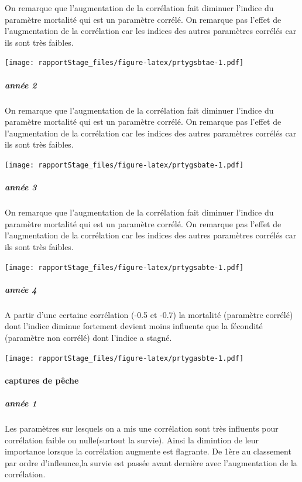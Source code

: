 \documentclass[
]{article}
\begin{document}
On remarque que l'augmentation de la corrélation fait diminuer l'indice
du paramètre mortalité qui est un paramètre corrélé. On remarque pas
l'effet de l'augmentation de la corrélation car les indices des autres
paramètres corrélés car ils sont très faibles.

\texttt{[image: rapportStage\_files/figure-latex/prtygsbtae-1.pdf]}

\hypertarget{annuxe9e-2}{%
\subparagraph{année 2}\label{annuxe9e-2}}

On remarque que l'augmentation de la corrélation fait diminuer l'indice
du paramètre mortalité qui est un paramètre corrélé. On remarque pas
l'effet de l'augmentation de la corrélation car les indices des autres
paramètres corrélés car ils sont très faibles.

\texttt{[image: rapportStage\_files/figure-latex/prtygsbate-1.pdf]}

\hypertarget{annuxe9e-3-3}{%
\subparagraph{année 3}\label{annuxe9e-3-3}}

On remarque que l'augmentation de la corrélation fait diminuer l'indice
du paramètre mortalité qui est un paramètre corrélé. On remarque pas
l'effet de l'augmentation de la corrélation car les indices des autres
paramètres corrélés car ils sont très faibles.

\texttt{[image: rapportStage\_files/figure-latex/prtygsabte-1.pdf]}

\hypertarget{annuxe9e-4-3}{%
\subparagraph{année 4}\label{annuxe9e-4-3}}

A partir d'une certaine corrélation (-0.5 et -0.7) la mortalité
(paramètre corrélé) dont l'indice diminue fortement devient moins
influente que la fécondité (paramètre non corrélé) dont l'indice a
stagné.

\texttt{[image: rapportStage\_files/figure-latex/prtygasbte-1.pdf]}

\hypertarget{captures-de-puxeache}{%
\paragraph{captures de pêche}\label{captures-de-puxeache}}

\hypertarget{annuxe9e-1-2}{%
\subparagraph{année 1}\label{annuxe9e-1-2}}

Les paramètres sur lesquels on a mis une corrélation sont très influents
pour corrélation faible ou nulle(surtout la survie). Ainsi la dimintion
de leur importance lorsque la corrélation augmente est flagrante. De
1ère au classement par ordre d'infleunce,la survie est passée avant
dernière avec l'augmentation de la corrélation.
\end{document}

